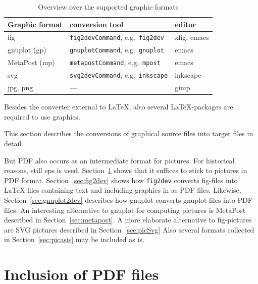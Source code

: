 \begin{longtable}{|l|ll|}
\toprule
Graphic format & conversion tool & editor \\
\midrule
\midrule
\endfirsthead%
\bottomrule
\caption{\label{tab:graphicOverview} 
Overview over the supported graphic formats }
\endlastfoot%
fig             & \texttt{fig2devCommand}, e.g.~\texttt{fig2dev}  & xfig, emacs   \\
gnuplot (gp)    & \texttt{gnuplotCommand}, e.g.~\texttt{gnuplot}  & emacs         \\
MetaPost (mp)   & \texttt{metapostCommand}, e.g.~\texttt{mpost}   & emacs         \\
svg             & \texttt{svg2devCommand}, e.g.~\texttt{inkscape} & inkscape      \\
jpg, png        & ---                                             & gimp          \\
\end{longtable}

Besides the converter external to \LaTeX, 
also several \LaTeX-packages are required 
to use graphics. 


This section describes the conversions of 
graphical source files into target files 
in detail. 

But PDF also occurs as an intermediate format for pictures. 
For historical reasons, still \gls{eps} is used. 
Section~\ref{sec:figpdf} shows that it suffices to stick to pictures 
in PDF format. 
Section~\ref{sec:fig2dev} shows how \texttt{fig2dev} converts fig-files 
into \LaTeX-files containing text and including graphics in as PDF files. 
Likewise, Section~\ref{sec:gnuplot2dev} describes 
how gnuplot converts gnuplot-files into PDF files. 
An interesting alternative to gnuplot for computing pictures 
is MetaPost described in Section~\ref{sec:metapost}. 
A more elaborate alternative to fig-pictures are SVG pictures 
described in Section~\ref{sec:picSvg}
Also several formats collected in Section~\ref{sec:picasis} 
may be included as is. 



\section{Inclusion of PDF files}\label{sec:figpdf}

